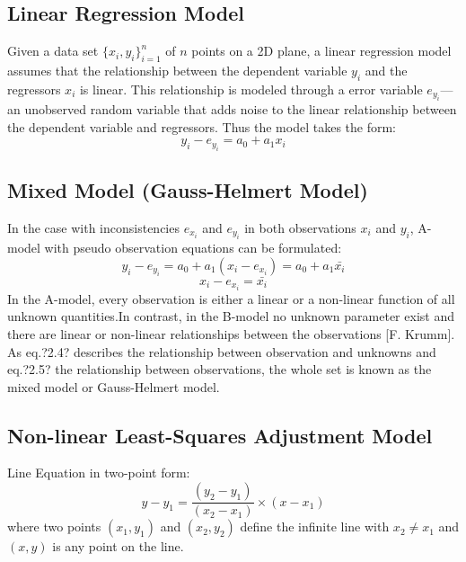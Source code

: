 \subsection{Linear Regression Model}
\label{subsec:LinearRegression}

Given a data set $\{x_i,y_i\}^n_{i=1}$ of $n$ points on a 2D plane, a linear regression model assumes that the relationship between the dependent variable $y_i$ and the regressors $x_i$ is linear. This relationship is modeled through a error variable $e_{y_i}$--- an unobserved random variable that adds noise to the linear relationship between the dependent variable and regressors.
Thus the model takes the form:
\begin{equation} %
y_i - e_{y_i} = a_0 + a_1x_i
\end{equation}


\subsection{Mixed Model (Gauss-Helmert Model)}
\label{subsec:MixedModel}

In the case with inconsistencies $e_{x_i}$ and $e_{y_i}$ in both observations $x_i$ and $y_i$, A-model with pseudo observation equations can be formulated:
\begin{equation} %
y_i - e_{y_i} = a_0 + a_1(x_i-e_{x_i}) = a_0 + a_1\bar{x_i}
\end{equation}
\begin{equation} %
x_i-e_{x_i} = \bar{x_i}
\end{equation}
In the A-model, every observation is either a linear or a non-linear function of all unknown quantities.In contrast, in the B-model no unknown parameter exist and there are linear or non-linear relationships between the observations [F. Krumm]. 
As eq.?2.4? describes the relationship between observation and unknowns and eq.?2.5? the relationship between observations, the whole set is known as the mixed model or Gauss-Helmert model.




\subsection{Non-linear Least-Squares Adjustment Model}
\label{subsec:NonLinear}

Line Equation in two-point form:
\begin{equation} %
y-y_1 = \dfrac{(y_2-y_1)}{(x_2-x_1)}\times(x-x_1)
\end{equation}
where two points $(x_1,y_1)$ and $(x_2,y_2)$ define the infinite line with $x_2\neq x_1$ and $(x,y)$ is any point on the line.

